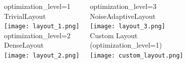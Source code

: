 \documentclass[aspectratio=169,11pt,hyperref={colorlinks=true}]{beamer}
\begin{document}
\begin{frame}
    \begin{columns}
            \centering
            optimization\_level=1\\
            TrivialLayout\\
            \texttt{[image: layout\_1.png]}\\
            optimization\_level=2\\
            DenseLayout\\
            \texttt{[image: layout\_2.png]}

            \centering
            optimization\_level=3\\
            NoiseAdaptiveLayout\\
            \texttt{[image: layout\_3.png]}\\
            Custom Layout\\
            (optimization\_level=1)\\
            \texttt{[image: custom\_layout.png]}
    \end{columns}
\end{frame}
\end{document}
